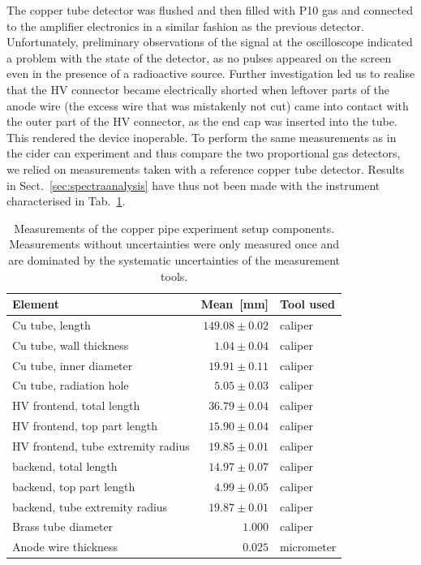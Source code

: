 The copper tube detector was flushed and then filled with P10 gas and connected to the amplifier electronics in a similar fashion as the previous detector. Unfortunately, preliminary observations of the signal at the oscilloscope indicated a problem with the state of the detector, as no pulses appeared on the screen even in the presence of a radioactive source. Further investigation led us to realise that the HV connector became electrically shorted when leftover parts of the anode wire (the excess wire that was mistakenly not cut) came into contact with the outer part of the HV connector, as the end cap was inserted into the tube. This rendered the device inoperable. To perform the same measurements as in the cider can experiment and thus compare the two proportional gas detectors, we relied on measurements taken with a reference copper tube detector.
Results in Sect.~\ref{sec:spectraanalysis} have thus not been made with the instrument characterised in Tab.~\ref{Tab:coppercan_sizes}.

\begin{table}[htb]
	\begin{tabularx}{\linewidth}{p{4cm}rp{2cm}}
		\textbf{Element}                   & \textbf{Mean}~{[}mm{]} & \textbf{Tool used} \\ \hline
		Cu tube, length                    & $149.08 \pm 0.02$      & caliper            \\
		Cu tube, wall thickness            & $1.04 \pm 0.04$        & caliper            \\
		Cu tube, inner diameter            & $19.91 \pm 0.11$       & caliper            \\
		Cu tube, radiation hole            & $5.05 \pm 0.03$        & caliper            \\
		HV frontend, total length          & $36.79 \pm 0.04$       & caliper            \\
		HV frontend, top part length       & $15.90 \pm 0.04$       & caliper            \\
		HV frontend, tube extremity radius & $19.85 \pm 0.01$       & caliper            \\
		backend, total length              & $14.97 \pm 0.07$       & caliper            \\
		backend, top part length           & $4.99 \pm 0.05$        & caliper            \\
		backend, tube extremity radius     & $19.87 \pm 0.01$       & caliper            \\
		Brass tube diameter                & $1.000$                & caliper            \\
		Anode wire thickness               & $0.025$                & micrometer         \\ \hline
	\end{tabularx}
\caption{Measurements of the copper pipe experiment setup components. Measurements without uncertainties were only measured once and are dominated by the systematic uncertainties of the measurement tools.}%
\label{Tab:coppercan_sizes}
\end{table}

